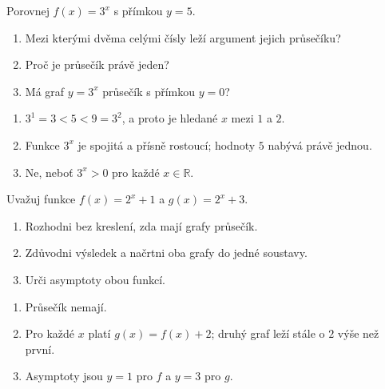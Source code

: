 \documentclass[11pt,a4paper]{article}
\begin{document}
\begin{prikladReseniBox}[title={Příklad 4}]
Porovnej $f(x)=3^x$ s přímkou $y=5$.
\begin{enumerate}[label=\alph*)]
  \item Mezi kterými dvěma celými čísly leží argument jejich průsečíku?
  \item Proč je průsečík právě jeden?
  \item Má graf $y=3^x$ průsečík s přímkou $y=0$?
\end{enumerate}
\tcblower
\begin{enumerate}[label=\alph*)]
  \item $3^1=3<5<9=3^2$, a proto je hledané $x$ mezi $1$ a $2$.
  \item Funkce $3^x$ je spojitá a přísně rostoucí; hodnoty $5$ nabývá právě jednou.
  \item Ne, neboť $3^x>0$ pro každé $x\in\mathbb{R}$.
\end{enumerate}
\end{prikladReseniBox}

\begin{prikladReseniBox}[title={Příklad 5}]
Uvažuj funkce $f(x)=2^x+1$ a $g(x)=2^x+3$.
\begin{enumerate}[label=\alph*)]
  \item Rozhodni bez kreslení, zda mají grafy průsečík.
  \item Zdůvodni výsledek a načrtni oba grafy do jedné soustavy.
  \item Urči asymptoty obou funkcí.
\end{enumerate}
\tcblower
\begin{enumerate}[label=\alph*)]
  \item Průsečík nemají.
  \item Pro každé $x$ platí $g(x)=f(x)+2$; druhý graf leží stále o $2$ výše než první.
  \item Asymptoty jsou $y=1$ pro $f$ a $y=3$ pro $g$.
\end{enumerate}
\end{prikladReseniBox}
\end{document}
